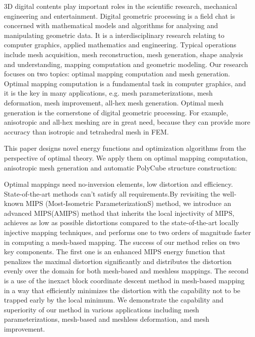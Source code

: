 \begin{enabstract}
3D digital contents play important roles in the scientific research, mechanical engineering and entertainment. Digital geometric processing is a field chat is concerned with mathematical models and algorithms for analysing and manipulating geometric data. It is a interdisciplinary research relating to computer graphics, applied mathematics and engineering. Typical operations include mesh acquisition, mesh reconstruction, mesh generation, shape analysis and understanding, mapping computation and geometric modeling. Our research focuses on two topics: optimal mapping computation and mesh generation. Optimal mapping computation is a fundamental task in computer graphics, and it is the key in many applications, e.g. mesh parameterizations, mesh deformation, mesh improvement, all-hex mesh generation. Optimal mesh generation is the cornerstone of digital geometric processing. For example, anisotropic and all-hex meshing are in great need, because they can provide more accuracy than isotropic and tetrahedral mesh in FEM. 

This paper designs novel energy functions and optimization algorithms from the perspective of optimal theory. We apply them on optimal mapping computation, anisotropic mesh generation and automatic PolyCube structure construction:

Optimal mappings need no-inversion elements, low distortion and efficiency. State-of-the-art methods can't satisfy all requirements.By revisiting the well-known MIPS (Most-Isometric ParameterizationS) method, we introduce an advanced MIPS(AMIPS) method that inherits the local injectivity of MIPS, achieves as low as possible distortions compared to the state-of-the-art locally injective mapping techniques, and performs one to two orders of magnitude faster in computing a mesh-based mapping. The success of our method relies on two key components. The first one is an enhanced MIPS energy function that penalizes the maximal distortion significantly and distributes the distortion evenly over the domain for both mesh-based and meshless mappings. The second is a use of the inexact block coordinate descent method in mesh-based mapping in a way that efficiently minimizes the distortion with the capability not to be trapped early by the local minimum. We demonstrate the capability and superiority of our method in various applications including mesh parameterizations, mesh-based and meshless deformation, and mesh improvement.


\end{enabstract}
